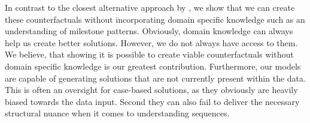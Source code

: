 \documentclass[./../../paper.tex]{subfiles}
\begin{document}
In contrast to the closest alternative approach by \citeauthor{hsieh_DiCE4ELInterpretingProcess_2021}, we show that we can create these counterfactuals without incorporating domain specific knowledge such as an understanding of milestone patterns. Obviously, domain knowledge can always help us create better solutions. However, we do not always have access to them. We believe, that showing it is possible to create viable counterfactuals without domain specific knowledge is our greatest contribution. Furthermore, our models are capable of generating solutions that are not currently present within the data. This is often an oversight for case-based solutions, as they obviously are heavily biased towards the data input. Second they can also fail to deliver the necessary structural nuance when it comes to understanding sequences.
\end{document}
